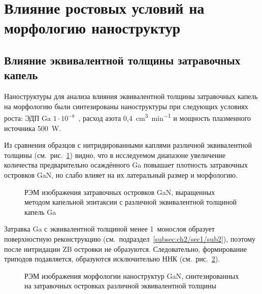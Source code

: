 \section{Влияние ростовых условий на морфологию
наноструктур}\label{sec:ch3/sec6}

\subsection{Влияние эквивалентной толщины затравочных
капель}\label{subsec:ch3/sec6/sub1}

Наноструктуры для анализа влияния эквивалентной толщины затравочных капель на
морфологию были синтезированы наноструктуры при следующих условиях роста: ЭДП
Ga \(1 \cdot 10^{-8}\)~\si{\torr}, расход азота
0,4~\si{\centi\meter^3\per\minute} и мощность плазменного источника
500~\si{\watt}.

Из сравнения образцов с нитридированными каплями различной эквивалентной
толщины (см.~рис.~\cref{fig:Image_20}) видно, что в исследуемом диапазоне
увеличение количества предварительно осаждённого Ga повышает плотность
затравочных островков GaN, но слабо влияет на их латеральный размер и
морфологию.

\begin{figure}[ht] 
			\caption{РЭМ изображения затравочных островков GaN, выращенных методом
				капельной эпитаксии с различной эквивалентной толщиной капель
		Ga}\label{fig:Image_20} \end{figure}

Затравка Ga с эквивалентной толщиной менее 1~монослоя образует поверхностную
реконструкцию (см.~подраздел~\cref{subsec:ch2/sec1/sub2}), поэтому после
нитридации ZB островки не образуются. Следовательно, формирование триподов
подавляется, образуются исключительно ННК (см.~рис.~\cref{fig:Image_21}).

\begin{figure}[ht] 
			 \caption{РЭМ
				изображения морфологии наноструктур GaN, синтезированных на затравочных
				островках различной эквивалентной толщины}\label{fig:Image_21}
			\end{figure}

